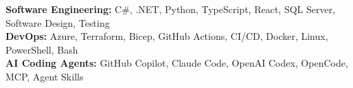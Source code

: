\textbf{Software Engineering:} C\#, .NET, Python, TypeScript, React, SQL Server, Software Design, Testing\\[2pt]
\textbf{DevOps:} Azure, Terraform, Bicep, GitHub Actions, CI/CD, Docker, Linux, PowerShell, Bash\\[2pt]
\textbf{AI Coding Agents:} GitHub Copilot, Claude Code, OpenAI Codex, OpenCode, MCP, Agent Skills

